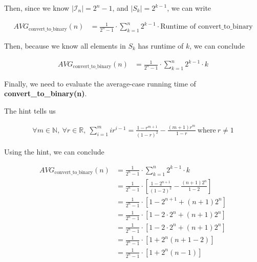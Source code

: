 \documentclass[12pt]{article}
\begin{document}
\begin{enumerate}[a.]
    Then, since we know $\lvert \mathcal{I}_n \rvert = 2^n - 1$, and
    $\lvert S_k \rvert = 2^{k-1}$, we can write

    \begin{align}
        AVG_{\text{convert\_to\_binary}}(n) &= \frac{1}{2^n - 1} \cdot \sum\limits_{k = 1}^n 2^{k-1} \cdot \text{Runtime of convert\_to\_binary}
    \end{align}

    \bigskip

    Then, because we know all elements in $S_k$ has runtime of $k$,
    we can conclude

    \begin{align}
        AVG_{\text{convert\_to\_binary}}(n) &= \frac{1}{2^n - 1} \cdot \sum\limits_{k = 1}^n 2^{k-1} \cdot k
    \end{align}

    \bigskip

    Finally, we need to evaluate the average-case running time of\\
    \textbf{convert\_to\_binary(n)}.

    \bigskip

    The hint tells us

    \begin{align}
        \forall m \in \mathbb{N},\:\forall r \in \mathbb{R},\:\sum\limits_{i=1}^m ir^{i-1} = \frac{1 - r^{m+1}}{(1-r)^2} - \frac{(m+1)r^m}{1-r}\:\text{where}\:r \neq 1
    \end{align}

    \bigskip

    Using the hint, we can conclude

    \begin{align}
        AVG_{\text{convert\_to\_binary}}(n) &= \frac{1}{2^n - 1} \cdot \sum\limits_{k = 1}^n 2^{k-1} \cdot k\\
        &= \frac{1}{2^n - 1} \cdot \left[ \frac{1 - 2^{n+1}}{(1-2)^2} - \frac{(n+1)2^n}{1-2} \right]\\
        &= \frac{1}{2^n - 1} \cdot \left[ 1 - 2^{n+1} + (n+1)2^n \right]\\
        &= \frac{1}{2^n - 1} \cdot \left[ 1 - 2 \cdot 2^n + (n+1)2^n \right]\\
        &= \frac{1}{2^n - 1} \cdot \left[ 1 - 2 \cdot 2^n + (n+1)2^n \right]\\
        &= \frac{1}{2^n - 1} \cdot \left[ 1 + 2^n(n+1 - 2) \right]\\
        &= \frac{1}{2^n - 1} \cdot \left[ 1 + 2^n(n-1) \right]
    \end{align}


\end{enumerate}
\end{document}
